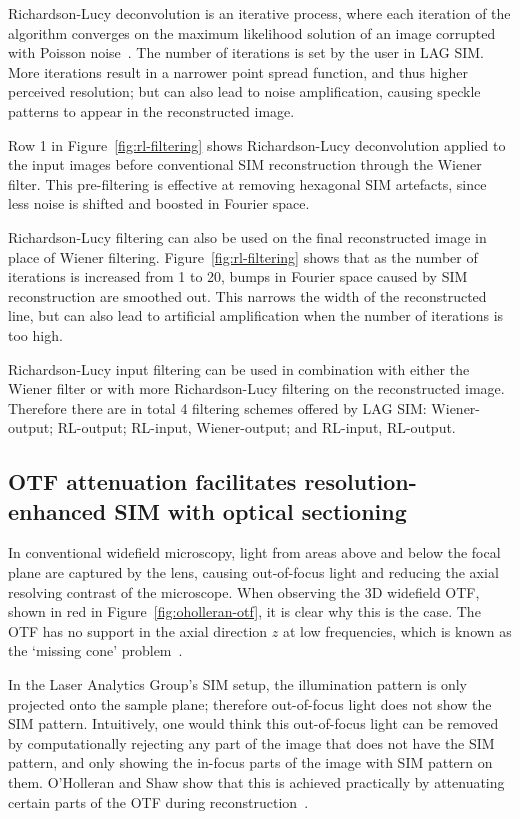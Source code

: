 Richardson-Lucy deconvolution is an iterative process, where each iteration of the algorithm converges on the maximum likelihood solution of an image corrupted with Poisson noise~\cite{richardson1972bayesian, lucy1974iterative}.
The number of iterations is set by the user in LAG SIM.
More iterations result in a narrower point spread function, and thus higher perceived resolution; but can also lead to noise amplification, causing speckle patterns to appear in the reconstructed image.

Row 1 in Figure~\ref{fig:rl-filtering} shows Richardson-Lucy deconvolution applied to the input images before conventional SIM reconstruction through the Wiener filter.
This pre-filtering is effective at removing hexagonal SIM artefacts, since less noise is shifted and boosted in Fourier space.

Richardson-Lucy filtering can also be used on the final reconstructed image in place of Wiener filtering.
Figure~\ref{fig:rl-filtering} shows that as the number of iterations is increased from 1 to 20, bumps in Fourier space caused by SIM reconstruction are smoothed out.
This narrows the width of the reconstructed line, but can also lead to artificial amplification when the number of iterations is too high.

Richardson-Lucy input filtering can be used in combination with either the Wiener filter or with more Richardson-Lucy filtering on the reconstructed image.
Therefore there are in total 4 filtering schemes offered by LAG SIM: Wiener-output; RL-output; RL-input, Wiener-output; and RL-input, RL-output.

\subsection{OTF attenuation facilitates resolution-enhanced SIM with optical sectioning}\label{sec:LAGSIM-OTF-attenuation}
In conventional widefield microscopy, light from areas above and below the focal plane are captured by the lens, causing out-of-focus light and reducing the axial resolving contrast of the microscope.
When observing the 3D widefield OTF, shown in red in Figure~\ref{fig:oholleran-otf}, it is clear why this is the case.
The OTF has no support in the axial direction $z$ at low frequencies, which is known as the `missing cone' problem~\cite{sheppard1992significance}.

In the Laser Analytics Group's SIM setup, the illumination pattern is only projected onto the sample plane; therefore out-of-focus light does not show the SIM pattern.
Intuitively, one would think this out-of-focus light can be removed by computationally rejecting any part of the image that does not have the SIM pattern, and only showing the in-focus parts of the image with SIM pattern on them.
O'Holleran and Shaw show that this is achieved practically by attenuating certain parts of the OTF during reconstruction~\cite{oholleran2014optimized, shaw2015high}.

